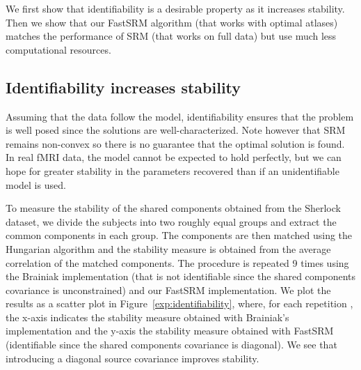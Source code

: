 \documentclass{article}
\newcommand{\bt}[1]{\todo[color=orange, inline=True]{BT: #1}}
\begin{document}
We first show that identifiability is a desirable property as it increases
stability.
%
Then we show that our FastSRM algorithm (that works with optimal atlases)
matches the performance of SRM (that works on full data) but use much less
computational resources.
%


\subsection{Identifiability increases stability}
Assuming that the data follow the model, identifiability ensures that the
problem is well posed since the solutions are well-characterized. Note however that SRM
remains non-convex so there is no guarantee that the optimal solution is found.
%
%
In real fMRI data, the model cannot be expected to hold perfectly, but we can
hope for greater stability in the parameters recovered than if an unidentifiable
model is used.


To measure the stability of the shared components obtained from the Sherlock
dataset, we divide the subjects into two roughly equal groups and extract the
common components in each group.
%
The components are then matched using the Hungarian algorithm and the stability
measure is obtained from the average correlation of the matched components.
%
The procedure is repeated 9 times using the Brainiak implementation (that is not
identifiable since the shared components covariance is unconstrained) and our
FastSRM implementation.
%
We plot the results as a scatter plot in Figure~\ref{exp:identifiability}, where, for each repetition , the x-axis indicates the stability measure obtained with Brainiak's implementation
 and the y-axis the stability measure
obtained with FastSRM (identifiable since the shared components covariance is diagonal).
%
We see that introducing a diagonal source covariance improves stability.
%
\end{document}
